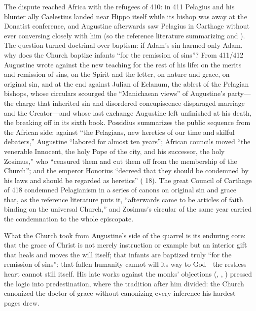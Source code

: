 The dispute reached Africa with the refugees of 410: in 411 Pelagius and
his blunter ally Caelestius landed near Hippo itself while its bishop was
away at the Donatist conference, and Augustine afterwards saw Pelagius in
Carthage without ever conversing closely with him (so the reference
literature summarizing  and ). The question turned doctrinal over baptism: if
Adam's sin
harmed only Adam, why does the Church baptize infants ``for the remission of
sins''? From 411/412 Augustine wrote against the new teaching for the rest
of his life: on the merits and remission of sins, on the Spirit and the
letter, on nature and grace, on original sin, and at the end against Julian
of Eclanum, the ablest of the Pelagian bishops, whose circulars scourged
the ``Manichaean views'' of Augustine's party---the charge that inherited
sin and disordered concupiscence disparaged marriage and the Creator---and
whose last exchange Augustine left unfinished at his death, the
 breaking off in its sixth book. Possidius
summarizes the public sequence from the African
side: against ``the Pelagians, new heretics of our time and skilful
debaters,'' Augustine ``labored for almost ten years''; African councils
moved ``the venerable Innocent, the holy Pope of the city, and his successor,
the holy Zosimus,'' who ``censured them and cut them off from the membership
of the Church''; and the emperor Honorius ``decreed that they should be
condemned by his laws and should be regarded as heretics'' ( 18).
The great Council of Carthage of 418 condemned Pelagianism in a series of
canons on original sin and grace that, as the reference literature puts it,
``afterwards came to be articles of faith binding on the universal
Church,'' and Zosimus's circular  of the same year
carried the condemnation to the whole episcopate.

What the Church took from Augustine's side of the quarrel is its enduring
core: that the grace of Christ is not merely instruction or example but an
interior gift that heals and moves the will itself; that infants are
baptized truly ``for the remission of sins''; that fallen humanity cannot
will its way to God---the restless heart cannot still itself. His late
works against the monks' objections (, , )
pressed the logic into predestination, where the tradition after him
divided: the Church canonized the doctor of grace without canonizing every
inference his hardest pages drew.

